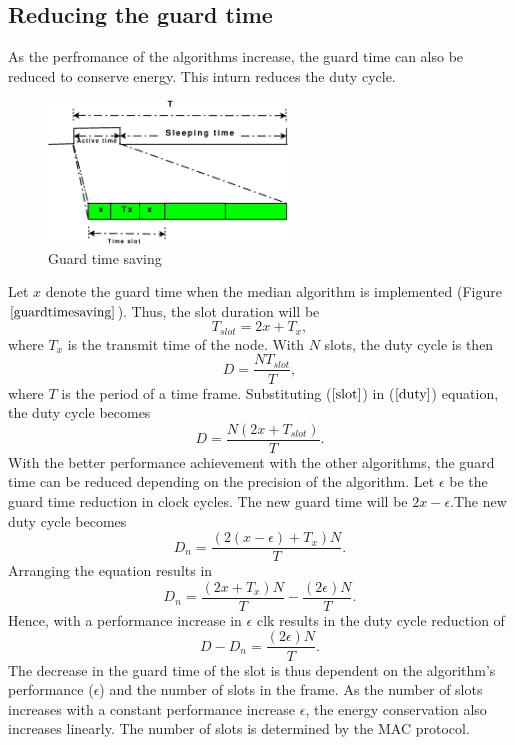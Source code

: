 \documentclass[journal]{IEEEtran}
\begin{document}
\subsection{\textbf{Reducing the guard time}}
As the perfromance of the algorithms increase, the guard time can also be reduced to conserve energy. This inturn
reduces the duty cycle.
\begin{figure}[b]
\centering
\includegraphics[width=2.5in]{guardtimesaving}
\caption{Guard time saving} \label{guardtimesaving}
\end{figure}
\newline Let $x$ denote the guard time when the median algorithm is
implemented (Figure $\ref{guardtimesaving}$). Thus, the slot
duration will be
\begin{equation}
T_{slot}=2x + T_x ,
\label{slot}
\end{equation}
where $T_x$ is the transmit time of the node. \newline 
With $N$ slots, the duty cycle is then
\begin{equation}
D = \frac{NT_{slot}}{T}, \label{duty}
\end{equation}
where $T$ is the period of a time frame. \newline Substituting
($\ref{slot}$) in ($\ref{duty}$) equation, the duty cycle becomes
\begin{equation}
D= \frac{N(2x+T_{slot})}{T}.
\end{equation}
With the better performance achievement with the other algorithms,
the guard time can be reduced depending on the precision of the
algorithm. Let $\epsilon$ be the guard time reduction in clock
cycles. The new guard time will be $2x-\epsilon$.\newline The
new duty cycle becomes
\begin{equation}
D_n=\frac{(2(x-\epsilon)+T_x)N}{T}.
\end{equation}
Arranging the equation results in
\begin{equation}
D_n= \frac{(2x+T_x)N}{T} - \frac{(2\epsilon)N}{T}.
\end{equation}
Hence, with a performance increase in $\epsilon$ clk results in the
duty cycle reduction of
\begin{equation}
D - D_n = \frac{(2\epsilon)N}{T}.
\end{equation}
The decrease in the guard time of the slot is thus dependent on the
algorithm's performance ($\epsilon$) and the number of slots in the
frame. As the number of slots increases with a constant performance increase $\epsilon$, the energy conservation
also increases linearly. The number of slots is determined by the
MAC protocol.
\end{document}
